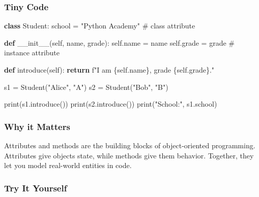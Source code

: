 \documentclass[
  letterpaper,
  DIV=11,
  numbers=noendperiod]{scrreprt}
\newenvironment{Shaded}{\begin{snugshade}}{\end{snugshade}}
\newcommand{\BuiltInTok}[1]{\textcolor[rgb]{0.00,0.23,0.31}{#1}}
\newcommand{\CommentTok}[1]{\textcolor[rgb]{0.37,0.37,0.37}{#1}}
\newcommand{\ControlFlowTok}[1]{\textcolor[rgb]{0.00,0.23,0.31}{\textbf{#1}}}
\newcommand{\FunctionTok}[1]{\textcolor[rgb]{0.28,0.35,0.67}{#1}}
\newcommand{\KeywordTok}[1]{\textcolor[rgb]{0.00,0.23,0.31}{\textbf{#1}}}
\newcommand{\NormalTok}[1]{\textcolor[rgb]{0.00,0.23,0.31}{#1}}
\newcommand{\OperatorTok}[1]{\textcolor[rgb]{0.37,0.37,0.37}{#1}}
\newcommand{\SpecialCharTok}[1]{\textcolor[rgb]{0.37,0.37,0.37}{#1}}
\newcommand{\SpecialStringTok}[1]{\textcolor[rgb]{0.13,0.47,0.30}{#1}}
\newcommand{\StringTok}[1]{\textcolor[rgb]{0.13,0.47,0.30}{#1}}
\newcommand{\VariableTok}[1]{\textcolor[rgb]{0.07,0.07,0.07}{#1}}
\begin{document}
\subsubsection{Tiny Code}\label{tiny-code-61}

\begin{Shaded}
\begin{Highlighting}[]
\KeywordTok{class}\NormalTok{ Student:}
\NormalTok{    school }\OperatorTok{=} \StringTok{"Python Academy"}   \CommentTok{\# class attribute}
    
    \KeywordTok{def} \FunctionTok{\_\_init\_\_}\NormalTok{(}\VariableTok{self}\NormalTok{, name, grade):}
        \VariableTok{self}\NormalTok{.name }\OperatorTok{=}\NormalTok{ name}
        \VariableTok{self}\NormalTok{.grade }\OperatorTok{=}\NormalTok{ grade      }\CommentTok{\# instance attribute}
    
    \KeywordTok{def}\NormalTok{ introduce(}\VariableTok{self}\NormalTok{):}
        \ControlFlowTok{return} \SpecialStringTok{f"I am }\SpecialCharTok{\{}\VariableTok{self}\SpecialCharTok{.}\NormalTok{name}\SpecialCharTok{\}}\SpecialStringTok{, grade }\SpecialCharTok{\{}\VariableTok{self}\SpecialCharTok{.}\NormalTok{grade}\SpecialCharTok{\}}\SpecialStringTok{."}

\NormalTok{s1 }\OperatorTok{=}\NormalTok{ Student(}\StringTok{"Alice"}\NormalTok{, }\StringTok{"A"}\NormalTok{)}
\NormalTok{s2 }\OperatorTok{=}\NormalTok{ Student(}\StringTok{"Bob"}\NormalTok{, }\StringTok{"B"}\NormalTok{)}

\BuiltInTok{print}\NormalTok{(s1.introduce())}
\BuiltInTok{print}\NormalTok{(s2.introduce())}
\BuiltInTok{print}\NormalTok{(}\StringTok{"School:"}\NormalTok{, s1.school)}
\end{Highlighting}
\end{Shaded}

\subsubsection{Why it Matters}\label{why-it-matters-61}

Attributes and methods are the building blocks of object-oriented
programming. Attributes give objects state, while methods give them
behavior. Together, they let you model real-world entities in code.

\subsubsection{Try It Yourself}\label{try-it-yourself-61}
\end{document}
